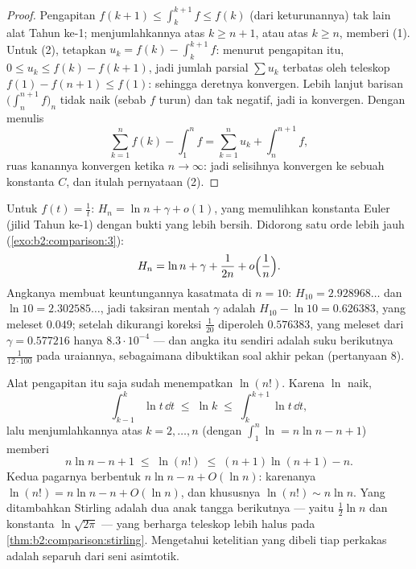 \begin{proof}
Pengapitan $f(k+1) \leq \int_k^{k+1} f \leq f(k)$ (dari keturunannya) tak
lain alat Tahun ke-1; menjumlahkannya atas $k \geq n+1$, atau atas $k
\geq n$, memberi (1). Untuk (2), tetapkan $u_k = f(k) - \int_k^{k+1} f$:
menurut pengapitan itu, $0 \leq u_k \leq f(k) - f(k+1)$, jadi jumlah
parsial $\sum u_k$ terbatas oleh teleskop $f(1) - f(n+1) \leq
f(1)$: sehingga deretnya konvergen. Lebih lanjut barisan
$\bigl(\int_n^{n+1} f\bigr)_n$ tidak naik (sebab $f$ turun) dan tak
negatif, jadi ia konvergen. Dengan menulis
\[
\sum_{k=1}^{n} f(k) - \int_1^n f
= \sum_{k=1}^{n} u_k + \int_n^{n+1} f ,
\]
ruas kanannya konvergen ketika $n \to \infty$: jadi selisihnya konvergen
ke sebuah konstanta $C$, dan itulah pernyataan (2).
\end{proof}

\begin{example}\label{ex:b2:comparison:harmonic}
Untuk $f(t) = \frac1t$: $H_n = \ln n + \gamma + o(1)$, yang memulihkan
konstanta Euler (jilid Tahun ke-1) dengan bukti yang lebih bersih.
Didorong satu orde lebih jauh (\cref{exo:b2:comparison:3}):
\[
H_n = \ln n + \gamma + \frac{1}{2n} + o\Bigl(\frac1n\Bigr).
\]
Angkanya membuat keuntungannya kasatmata di $n = 10$: $H_{10} =
2.928968\dots$ dan $\ln 10 = 2.302585\dots$, jadi taksiran mentah
$\gamma$ adalah $H_{10} - \ln 10 = 0.626383$, yang meleset $0.049$;
setelah dikurangi koreksi $\frac1{20}$ diperoleh $0.576383$,
yang meleset dari $\gamma = 0.577216$ hanya $8.3\cdot10^{-4}$ ---
dan angka itu sendiri adalah suku berikutnya $\frac{1}{12\cdot100}$ pada
uraiannya, sebagaimana dibuktikan soal akhir pekan (pertanyaan 8).
\end{example}

\begin{example}\label{ex:b2:comparison:lnfactorial}
Alat pengapitan itu saja sudah menempatkan $\ln(n!)$. Karena
$\ln$ naik,
\[
\int_{k-1}^{k}\ln t\,\dd t \;\leq\; \ln k \;\leq\;
\int_{k}^{k+1}\ln t\,\dd t ,
\]
lalu menjumlahkannya atas $k = 2, \dots, n$ (dengan $\int_1^n\ln = n\ln n
- n + 1$) memberi
\[
n\ln n - n + 1 \;\leq\; \ln(n!) \;\leq\; (n+1)\ln(n+1) - n .
\]
Kedua pagarnya berbentuk $n\ln n - n + O(\ln n)$: karenanya $\ln(n!) =
n\ln n - n + O(\ln n)$, dan khususnya $\ln(n!) \sim n\ln n$.
Yang ditambahkan Stirling adalah dua anak tangga berikutnya --- yaitu
$\frac12\ln n$ dan konstanta $\ln\sqrt{2\pi}$ --- yang berharga
teleskop lebih halus pada \cref{thm:b2:comparison:stirling}. Mengetahui
ketelitian yang dibeli tiap perkakas adalah separuh dari seni asimtotik.
\end{example}

